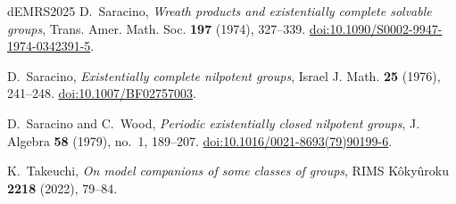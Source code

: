 \documentclass[11pt,reqno]{article}
\theoremstyle{definition}
\theoremstyle{remark}
\begin{document}
\begin{thebibliography}{dEMRS2025}
D.~Saracino,
\emph{Wreath products and existentially complete solvable groups},
Trans. Amer. Math. Soc. \textbf{197} (1974), 327--339.
\href{https://doi.org/10.1090/S0002-9947-1974-0342391-5}
     {doi:10.1090/S0002-9947-1974-0342391-5}.

D.~Saracino,
\emph{Existentially complete nilpotent groups},
Israel J. Math. \textbf{25} (1976), 241--248.
\href{https://doi.org/10.1007/BF02757003}
     {doi:10.1007/BF02757003}.

D.~Saracino and C.~Wood,
\emph{Periodic existentially closed nilpotent groups},
J. Algebra \textbf{58} (1979), no.~1, 189--207.
\href{https://doi.org/10.1016/0021-8693(79)90199-6}
     {doi:10.1016/0021-8693(79)90199-6}.

K.~Takeuchi,
\emph{On model companions of some classes of groups},
RIMS K\^oky\^uroku \textbf{2218} (2022), 79--84.



\end{thebibliography}
\end{document}
